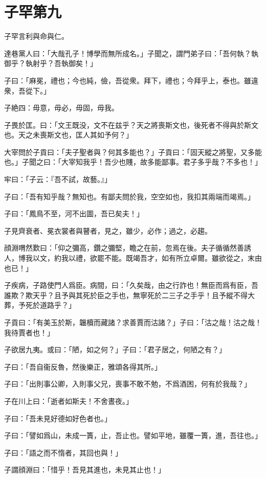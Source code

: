 \section[子罕第九]{子罕第九}

子罕言利與命與仁。

達巷黨人曰：「大哉孔子！博學而無所成名。」子聞之，謂門弟子曰：「吾何執？執御乎？執射乎？吾執御矣！」

子曰：「麻冕，禮也；今也純，儉，吾從衆。拜下，禮也；今拜乎上，泰也。雖違衆，吾從下。」

子絶四：毋意，毋必，毋固，毋我。

子畏於匡。曰：「文王既没，文不在兹乎？天之將喪斯文也，後死者不得與於斯文也。天之未喪斯文也，匡人其如予何？」

大宰問於子貢曰：「夫子聖者與？何其多能也？」子貢曰：「固天縱之將聖，又多能也。」子聞之曰：「大宰知我乎！吾少也賤，故多能鄙事。君子多乎哉？不多也！」

牢曰：「子云：『吾不試，故藝。』」

子曰：「吾有知乎哉？無知也。有鄙夫問於我，空空如也，我扣其兩端而竭焉。」

子曰：「鳳鳥不至，河不出圖，吾已矣夫！」

子見齊衰者、冕衣裳者與瞽者，見之，雖少，必作；過之，必趨。

顔淵喟然歎曰：「仰之彌高，鑽之彌堅，瞻之在前，忽焉在後。夫子循循然善誘人，博我以文，約我以禮，欲罷不能。既竭吾才，如有所立卓爾。雖欲從之，末由也已！」

子疾病，子路使門人爲臣。病間，曰：「久矣哉，由之行詐也！無臣而爲有臣，吾誰欺？欺天乎？且予與其死於臣之手也，無寧死於二三子之手乎！且予縱不得大葬，予死於道路乎？」

子貢曰：「有美玉於斯，韞櫝而藏諸？求善賈而沽諸？」子曰：「沽之哉！沽之哉！我待賈者也！」

子欲居九夷。或曰：「陋，如之何？」子曰：「君子居之，何陋之有？」

子曰：「吾自衞反魯，然後樂正，雅頌各得其所。」

子曰：「出則事公卿，入則事父兄，喪事不敢不勉，不爲酒困，何有於我哉？」

子在川上曰：「逝者如斯夫！不舍晝夜。」

子曰：「吾未見好德如好色者也。」

子曰：「譬如爲山，未成一簣，止，吾止也。譬如平地，雖覆一簣，進，吾往也。」

子曰：「語之而不惰者，其回也與！」

子謂顔淵曰：「惜乎！吾見其進也，未見其止也！」

